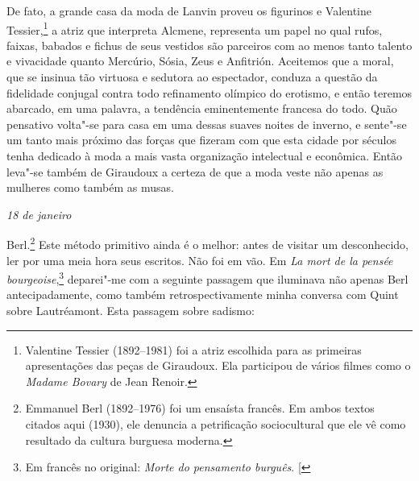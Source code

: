 De fato, a grande casa da moda de Lanvin proveu os figurinos e Valentine
Tessier,\footnote{Valentine Tessier (1892--1981) foi a atriz
  escolhida para as primeiras apresentações das peças de Giraudoux. Ela
  participou de vários filmes como o \emph{Madame Bovary} de Jean
  Renoir. \versal{[N.~O.]}} a atriz que interpreta Alcmene, representa um papel no qual
rufos, faixas, babados e fichus de seus vestidos são parceiros com ao
menos tanto talento e vivacidade quanto Mercúrio, Sósia, Zeus e
Anfitrión. Aceitemos que a moral, que se insinua tão virtuosa e sedutora
ao espectador, conduza a questão da fidelidade conjugal contra todo
refinamento olímpico do erotismo, e então teremos abarcado, em uma
palavra, a tendência eminentemente francesa do todo. Quão pensativo volta"-se
para casa em uma dessas suaves noites de inverno, e sente"-se um
tanto mais próximo das forças que fizeram com que esta cidade por
séculos tenha dedicado à moda a mais vasta organização intelectual e
econômica. Então leva"-se também de Giraudoux a certeza de que a moda
veste não apenas as mulheres como também as musas.

\begin{flushright}
\emph{18 de janeiro}
\end{flushright}

Berl.\footnote{Emmanuel Berl (1892--1976) foi um
  ensaísta francês. Em ambos textos citados aqui (1930), ele denuncia a
  petrificação sociocultural que ele vê como resultado da cultura
  burguesa moderna. \versal{[N.~O.]}} Este método primitivo ainda é o melhor: antes de
visitar um desconhecido, ler por uma meia hora seus escritos. Não foi em
vão. Em \emph{La mort de la pensée bourgeoise},\footnote{Em francês no original: \emph{Morte do pensamento burguês}. {[}\versal{N.~T}{]}} deparei"-me com a seguinte
passagem que iluminava não apenas Berl antecipadamente, como também
retrospectivamente minha conversa com Quint sobre Lautréamont. Esta
passagem sobre sadismo:

